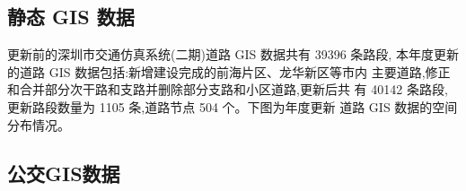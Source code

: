 \subsection{静态 GIS 数据}
更新前的深圳市交通仿真系统(二期)道路 GIS 数据共有 39396 条路段,
本年度更新的道路 GIS 数据包括:新增建设完成的前海片区、龙华新区等市内
主要道路,修正和合并部分次干路和支路并删除部分支路和小区道路,更新后共
有 40142 条路段,更新路段数量为 1105 条,道路节点 504 个。下图为年度更新
道路 GIS 数据的空间分布情况。

\subsection{公交GIS数据}

